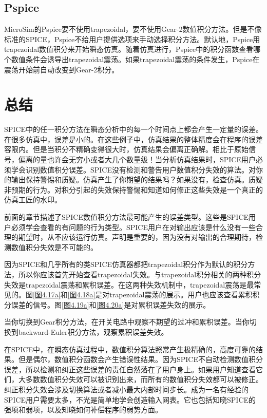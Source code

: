 \subsection{Pspice}
MicroSim的Pspice要不使用trapezoidal，要不使用Gear-2数值积分方法。但是不像标准的SPICE，Pspice不给用户提供选项来手动选择积分方法。默认地，Pspice用trapezoidal数值积分来开始瞬态仿真。随着仿真进行，Pspice中的积分函数查看哪个数值条件会诱导出trapezoidal震荡。如果trapezoidal震荡的条件发生，Pspice在震荡开始前自动改变到Gear-2积分。

\section{总结}
SPICE中的任一积分方法在瞬态分析中的每一个时间点上都会产生一定量的误差。在很多仿真中，误差是小的。在这些例子中，仿真结果的整体精度会在程序的误差容限内。但是当积分不精确变得很大时，仿真结果会偏离正确解。相比于原始信号，偏离的量也许会无穷小或者大几个数量级！当分析仿真结果时，SPICE用户必须学会识别数值积分误差。SPICE没有检测和警告用户数值积分失效的算法。对你的输出保持警惕和质疑。仿真产生了你期望的结果吗？如果没有，检查仿真。质疑非预期的行为。对积分引起的失效保持警惕和知道如何修正这些失效是一个真正的仿真工匠的水印。

前面的章节描述了SPICE数值积分方法最可能产生的误差类型。这些是SPICE用户必须学会查看的有问题的行为类型。SPICE用户在对输出应该是什么没有一些合理的期望时，从不应该运行仿真。声明是重要的，因为没有对输出的合理期待，检测数值积分失效是不可能的。

因为SPICE和几乎所有的类SPICE仿真器都把trapezoidal积分作为默认的积分方法，所以你应该首先开始查看trapezoidal失效。与trapezoidal积分相关的两种积分失效是trapezoidal震荡和累积误差。在这两种失效机制中，trapezoidal震荡是最常见的。图\ref{图4.17a}和\ref{图4.18a}是对trapezoidal震荡的展示。用户也应该查看累积积分误差的信号。图\ref{图4.19a}和\ref{图4.20a}是对累积误差失效的展示。

当你切换到Gear积分方法，在开关电路中观察不期望的过冲和累积误差。当你切换到backward-Euler积分方法，观察累积误差失效。

在SPICE中，在瞬态仿真过程中，数值积分算法照常产生极精确的，高度可靠的结果。但是偶尔，数值积分函数会产生错误性结果。因为SPICE不自动检测数值积分误差，所以检测和纠正这些误差的责任自然落在了用户身上。如果用户知道查看它们，大多数数值积分失效可以被识别出来，而所有的数值积分失效都可以被修正。纠正积分失效会涉及切换算法或者减小最大内部时间步长。成为一名有经验的SPICE用户需要太多，不光是简单地学会创造输入网表。它也包括知晓SPICE的强项和弱项，以及知晓如何补偿程序的弱势方面。



